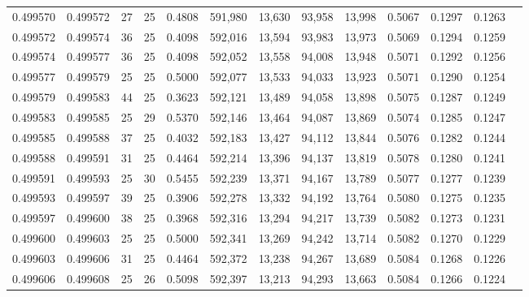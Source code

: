 \begin{tabular}{rrrrrrrrrrrrr}
0.499570 & 0.499572 &    27 &  25 &                                     0.4808 & 591,980 &  13,630 &  93,958 &  13,998 & 0.5067 & 0.1297 & 0.1263 \\
0.499572 & 0.499574 &    36 &  25 &                                     0.4098 & 592,016 &  13,594 &  93,983 &  13,973 & 0.5069 & 0.1294 & 0.1259 \\
0.499574 & 0.499577 &    36 &  25 &                                     0.4098 & 592,052 &  13,558 &  94,008 &  13,948 & 0.5071 & 0.1292 & 0.1256 \\
0.499577 & 0.499579 &    25 &  25 &                                     0.5000 & 592,077 &  13,533 &  94,033 &  13,923 & 0.5071 & 0.1290 & 0.1254 \\
0.499579 & 0.499583 &    44 &  25 &                                     0.3623 & 592,121 &  13,489 &  94,058 &  13,898 & 0.5075 & 0.1287 & 0.1249 \\
0.499583 & 0.499585 &    25 &  29 &                                     0.5370 & 592,146 &  13,464 &  94,087 &  13,869 & 0.5074 & 0.1285 & 0.1247 \\
0.499585 & 0.499588 &    37 &  25 &                                     0.4032 & 592,183 &  13,427 &  94,112 &  13,844 & 0.5076 & 0.1282 & 0.1244 \\
0.499588 & 0.499591 &    31 &  25 &                                     0.4464 & 592,214 &  13,396 &  94,137 &  13,819 & 0.5078 & 0.1280 & 0.1241 \\
0.499591 & 0.499593 &    25 &  30 &                                     0.5455 & 592,239 &  13,371 &  94,167 &  13,789 & 0.5077 & 0.1277 & 0.1239 \\
0.499593 & 0.499597 &    39 &  25 &                                     0.3906 & 592,278 &  13,332 &  94,192 &  13,764 & 0.5080 & 0.1275 & 0.1235 \\
0.499597 & 0.499600 &    38 &  25 &                                     0.3968 & 592,316 &  13,294 &  94,217 &  13,739 & 0.5082 & 0.1273 & 0.1231 \\
0.499600 & 0.499603 &    25 &  25 &                                     0.5000 & 592,341 &  13,269 &  94,242 &  13,714 & 0.5082 & 0.1270 & 0.1229 \\
0.499603 & 0.499606 &    31 &  25 &                                     0.4464 & 592,372 &  13,238 &  94,267 &  13,689 & 0.5084 & 0.1268 & 0.1226 \\
0.499606 & 0.499608 &    25 &  26 &                                     0.5098 & 592,397 &  13,213 &  94,293 &  13,663 & 0.5084 & 0.1266 & 0.1224 \\

\end{tabular}
